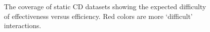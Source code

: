     
    \begin{figure}[h!]
        \begin{center}
            
            \caption{The coverage of static \ac{CD} datasets showing the expected difficulty of effectiveness versus efficiency. Red colors are more `difficult' interactions.}
            \label{Figure:cd-datasets}
        \end{center}
    \end{figure}

